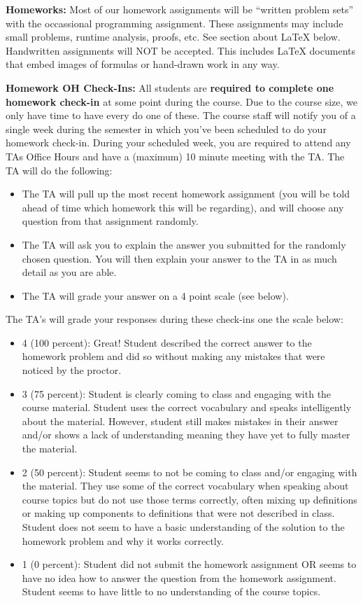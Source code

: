 \documentclass[12pt]{article}
\begin{document}
\textbf{Homeworks:} Most of our homework assignments will be ``written problem sets'' with the occassional programming assignment. These assignments may include small problems, runtime analysis, proofs, etc.  See section about \LaTeX{} below. Handwritten assignments will NOT be accepted. This includes \LaTeX{} documents that embed images of formulas or hand-drawn work in any way.

\textbf{Homework OH Check-Ins:} All students are \textbf{required to complete one homework check-in} at some point during the course. Due to the course size, we only have time to have every do one of these. The course staff will notify you of a single week during the semester in which you've been scheduled to do your homework check-in. During your scheduled week, you are required to attend any TAs Office Hours and have a (maximum) 10 minute meeting with the TA. The TA will do the following:

\begin{itemize}
\item The TA will pull up the most recent homework assignment (you will be told ahead of time which homework this will be regarding), and will choose any question from that assignment randomly. 
\item The TA will ask you to explain the answer you submitted for the randomly chosen question. You will then explain your answer to the TA in as much detail as you are able.
\item The TA will grade your answer on a 4 point scale (see below).
\end{itemize}

The TA's will grade your responses during these check-ins one the scale below:

\begin{itemize}
\item 4 (100 percent): Great! Student described the correct answer to the homework problem and did so without making any mistakes that were noticed by the proctor.
\item 3 (75 percent): Student is clearly coming to class and engaging with the course material. Student uses the correct vocabulary and speaks intelligently about the material. However, student still makes mistakes in their answer and/or shows a lack of understanding meaning they have yet to fully master the material.
\item 2 (50 percent): Student seems to not be coming to class and/or engaging with the material. They use some of the correct vocabulary when speaking about course topics but do not use those terms correctly, often mixing up definitions or making up components to definitions that were not described in class. Student does not seem to have a basic understanding of the solution to the homework problem and why it works correctly.
\item 1 (0 percent): Student did not submit the homework assignment OR seems to have no idea how to answer the question from the homework assignment. Student seems to have little to no understanding of the course topics.
\end{itemize}
\end{document}
